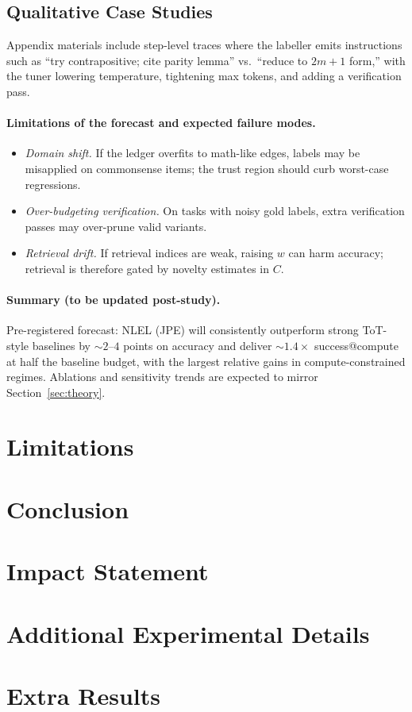 \documentclass{article}
\theoremstyle{plain}
\theoremstyle{definition}
\theoremstyle{remark}
\begin{document}
\subsection{Qualitative Case Studies}

Appendix materials include step-level traces where the labeller emits instructions such as ``try contrapositive; cite parity lemma'' vs.\ ``reduce to $2m{+}1$ form,'' with the tuner lowering temperature, tightening max tokens, and adding a verification pass.

\paragraph{Limitations of the forecast and expected failure modes.}
\begin{itemize}\setlength{\itemsep}{2pt}
    \item \emph{Domain shift.} If the ledger overfits to math-like edges, labels may be misapplied on commonsense items; the trust region should curb worst-case regressions.
    \item \emph{Over-budgeting verification.} On tasks with noisy gold labels, extra verification passes may over-prune valid variants.
    \item \emph{Retrieval drift.} If retrieval indices are weak, raising $w$ can harm accuracy; retrieval is therefore gated by novelty estimates in $C$.
\end{itemize}

\paragraph{Summary (to be updated post-study).}
Pre-registered forecast: NLEL (JPE) will consistently outperform strong ToT-style baselines by $\sim2$--$4$ points on accuracy and deliver $\sim1.4\times$ success@compute at half the baseline budget, with the largest relative gains in compute-constrained regimes. Ablations and sensitivity trends are expected to mirror Section~\ref{sec:theory}.\section{Limitations}

\section{Conclusion}

\section*{Impact Statement}





\appendix

\section{Additional Experimental Details}
\section{Extra Results}
\end{document}

